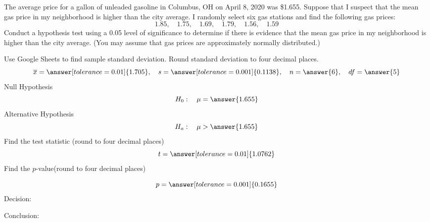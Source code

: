\documentclass{ximera}
\begin{document}
\begin{problem}\label{prob:140hom9prob6}
The average price for a gallon of unleaded gasoline in Columbus, OH on April 8, 2020 was \$1.655.  Suppose that I suspect that the mean gas price in my neighborhood is higher than the city average.  I randomly select six gas stations and find the following gas prices:
$$1.85,\quad 1.75, \quad 1.69,\quad 1.79,\quad 1.56,\quad 1.59$$
Conduct a hypothesis test using a 0.05 level of significance to determine if there is evidence that the mean gas price in my neighborhood is higher than the city average.  (You may assume that gas prices are approximately normally distributed.)

Use Google Sheets to find sample standard deviation.  Round standard deviation to four decimal places.
$$\overline{x}=\answer[tolerance=0.01]{1.705},\quad s=\answer[tolerance=0.001]{0.1138},\quad n=\answer{6},\quad df=\answer{5}$$
Null Hypothesis
$$H_0:\quad \mu=\answer{1.655}$$
Alternative Hypothesis
$$H_a:\quad \mu>\answer{1.655}$$
Find the test statistic (round to four decimal places)
$$t=\answer[tolerance=0.01]{1.0762}$$
Find the $p$-value(round to four decimal places)
\begin{center}  
\end{center}
$$p=\answer[tolerance=0.001]{0.1655}$$
Decision:

\begin{multipleChoice} 
\end{multipleChoice}  

Conclusion:

\begin{multipleChoice} 
\end{multipleChoice} 
\end{problem}
\end{document}
